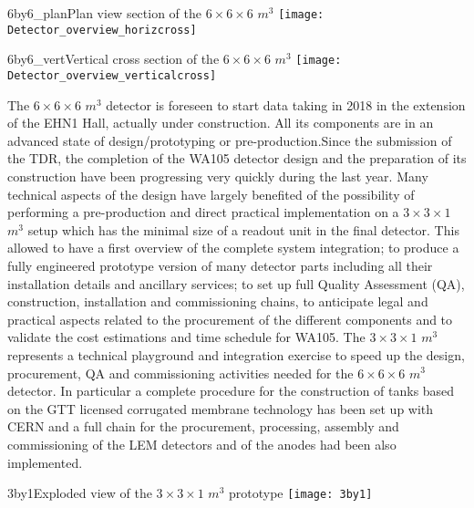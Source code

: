 \begin{cdrfigure}{6by6_plan}{\small Plan view section of the $6\times 6\times 6$ $m^3$ }
\texttt{[image: Detector\_overview\_horizcross]}
\end{cdrfigure}

\begin{cdrfigure}{6by6_vert}{\small Vertical cross section of the $6\times 6\times 6$ $m^3$}
\texttt{[image: Detector\_overview\_verticalcross]}
\end{cdrfigure}


The $6\times 6\times 6$ $m^3$  detector is foreseen to start data taking in 2018 in the extension of the EHN1 Hall, actually under construction. All its components are in an advanced state of design/prototyping or pre-production.Since the submission of the TDR, the completion of the WA105 detector design and the preparation of its construction have been progressing very quickly during the last year. Many technical aspects of the design have largely benefited of the possibility of performing a pre-production and direct practical implementation on a  $3 \times 3 \times 1$ $m^3$  setup which has the minimal size of a readout unit in the final detector.  This allowed to have a first overview of the complete system integration; to produce a fully engineered prototype version of many detector parts including all their installation details and ancillary services; to set up full Quality Assessment (QA), construction, installation and commissioning chains, to anticipate legal and practical aspects related to the procurement of the different components and to validate the cost estimations and time schedule for WA105.  The  $3 \times 3 \times 1$ $m^3$   represents a technical playground and integration exercise to speed up the design, procurement, QA and commissioning activities needed for the  $6\times 6\times 6$ $m^3$ detector.  In particular a complete procedure for the construction of tanks based on the GTT licensed corrugated membrane technology has been set up with CERN and a full chain for the procurement, processing, assembly and commissioning of the LEM detectors and of the anodes had been also implemented.

\begin{cdrfigure}{3by1}{Exploded view of the  $3\times 3\times 1$  $m^3$  prototype}
\texttt{[image: 3by1]}
\end{cdrfigure}